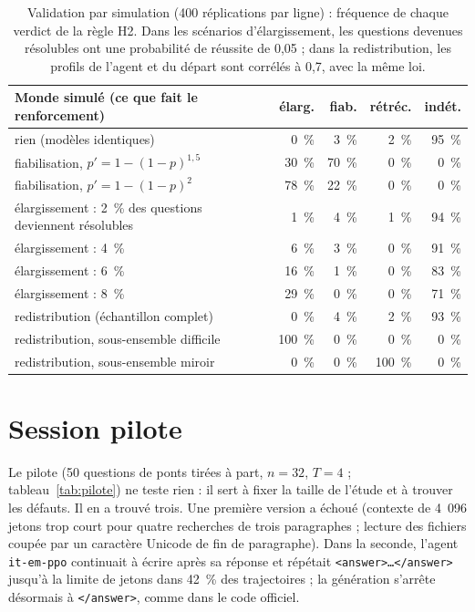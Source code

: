 \begin{table}[h]\centering\small
\begin{tabular}{>{\raggedright\arraybackslash}p{6.4cm}rrrr}\toprule
Monde simulé (ce que fait le renforcement) & élarg. & fiab. & rétréc. & indét.\\\midrule
rien (modèles identiques) & 0~\% & 3~\% & 2~\% & 95~\%\\
fiabilisation, $p' = 1 - (1-p)^{1{,}5}$ & 30~\% & 70~\% & 0~\% & 0~\%\\
fiabilisation, $p' = 1 - (1-p)^{2}$ & 78~\% & 22~\% & 0~\% & 0~\%\\
élargissement : 2~\% des questions deviennent résolubles & 1~\% & 4~\% & 1~\% & 94~\%\\
élargissement : 4~\% & 6~\% & 3~\% & 0~\% & 91~\%\\
élargissement : 6~\% & 16~\% & 1~\% & 0~\% & 83~\%\\
élargissement : 8~\% & 29~\% & 0~\% & 0~\% & 71~\%\\
redistribution (échantillon complet) & 0~\% & 4~\% & 2~\% & 93~\%\\
redistribution, sous-ensemble difficile & 100~\% & 0~\% & 0~\% & 0~\%\\
redistribution, sous-ensemble miroir & 0~\% & 0~\% & 100~\% & 0~\%\\\bottomrule
\end{tabular}
\caption{Validation par simulation (400 réplications par ligne) : fréquence de chaque verdict de la règle H2. Dans les scénarios d'élargissement, les questions devenues résolubles ont une probabilité de réussite de 0,05 ; dans la redistribution, les profils de l'agent et du départ sont corrélés à 0,7, avec la même loi.}\label{tab:simulation}
\end{table}

\section{Session pilote}

Le pilote (50 questions de ponts tirées à part, $n = 32$, $T = 4$ ; tableau~\ref{tab:pilote}) ne teste rien : il sert à fixer la taille de l'étude et à trouver les défauts. Il en a trouvé trois. Une première version a échoué (contexte de 4~096 jetons trop court pour quatre recherches de trois paragraphes ; lecture des fichiers coupée par un caractère Unicode de fin de paragraphe). Dans la seconde, l'agent \texttt{it-em-ppo} continuait à écrire après sa réponse et répétait \texttt{<answer>…</answer>} jusqu'à la limite de jetons dans 42~\% des trajectoires ; la génération s'arrête désormais à \texttt{</answer>}, comme dans le code officiel.

